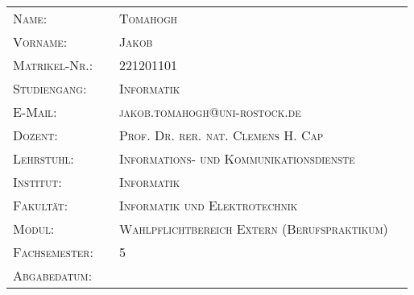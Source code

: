 \documentclass{Vorlage}
\begin{document}

\begin{titlepage}


\vspace*{6cm}



\begin{tabular}{p{3.5cm}|p{0.1cm} p{10cm}l}
\textsc{Name:} & & \textsc{Tomahogh}\\
\textsc{Vorname:} & & \textsc{Jakob}\\
\textsc{Matrikel-Nr.:} & & \textsc{221201101}\\
\textsc{Studiengang:} & & \textsc{Informatik}\\
\textsc{E-Mail:} & & \textsc{jakob.tomahogh@uni-rostock.de}\\
\textsc{Dozent:} & & \textsc{Prof. Dr. rer. nat. Clemens H. Cap}\\
\textsc{Lehrstuhl:} & & \textsc{Informations- und Kommunikationsdienste}\\
\textsc{Institut:} & & \textsc{Informatik}\\
\textsc{Fakultät:} & & \textsc{Informatik und Elektrotechnik}\\
\textsc{Modul:} & & \textsc{Wahlpflichtbereich Extern (Berufspraktikum)}\\
\textsc{Fachsemester:} & & \textsc{5}\\
\textsc{Abgabedatum:} & & \textsc{}\\
\end{tabular}
\end{titlepage}

\restoregeometry


\tableofcontents %

\listoffigures %

\newpage %


\renewcommand{\thesection}{\Roman{section}} %
\end{document}
